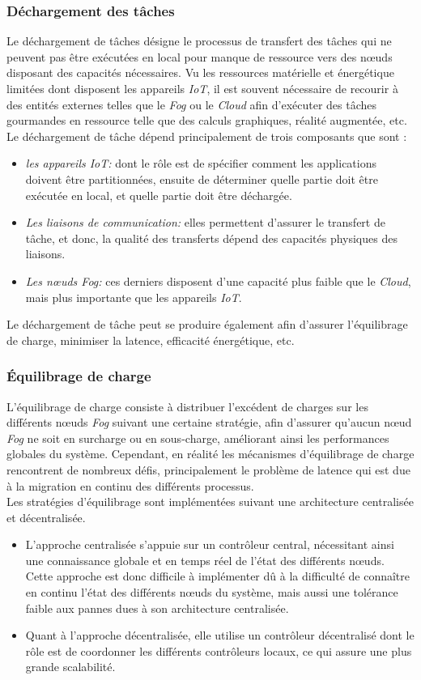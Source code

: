 \subsubsection{Déchargement des tâches}
Le déchargement de tâches désigne le processus de transfert des tâches qui ne peuvent pas être exécutées en local pour manque de ressource vers des nœuds disposant des capacités nécessaires. Vu les ressources matérielle et énergétique limitées dont disposent les appareils \emph{IoT}, il est souvent nécessaire de recourir à des entités externes telles que le \emph{Fog} ou le \emph{Cloud} afin d'exécuter des tâches gourmandes en ressource telle que des calculs graphiques, réalité augmentée, etc.\\
Le déchargement de tâche dépend principalement de trois composants que sont :
\begin{itemize}
  \item \emph{les appareils IoT:} dont le rôle est de spécifier comment les applications doivent être partitionnées, ensuite de déterminer quelle partie doit être exécutée en local, et quelle partie doit être déchargée.
  \item \emph{Les liaisons de communication:}  elles permettent d'assurer le transfert de tâche, et donc, la qualité des transferts dépend des capacités physiques des liaisons.
  \item \emph{Les nœuds Fog:} ces derniers disposent d'une capacité plus faible que le \emph{Cloud}, mais plus importante que les appareils \emph{IoT}.
\end{itemize}
Le déchargement de tâche peut se produire également afin d'assurer l'équilibrage de charge, minimiser la latence, efficacité énergétique, etc.

\subsubsection{Équilibrage de charge}
L'équilibrage de charge \cite{Ash2019} consiste à distribuer l'excédent de charges sur les différents nœuds \emph{Fog} suivant une certaine stratégie, afin d'assurer qu'aucun nœud \emph{Fog} ne soit en surcharge ou en sous-charge, améliorant ainsi les performances globales du système. Cependant, en réalité les mécanismes d'équilibrage de charge rencontrent de nombreux défis, principalement le problème de latence qui est due à la migration en continu des différents processus.\\
Les stratégies d'équilibrage sont implémentées suivant une architecture centralisée et décentralisée.
\begin{itemize}
  \item L'approche centralisée s'appuie sur un contrôleur central, nécessitant ainsi une connaissance globale et en temps réel de l'état des différents nœuds.
  Cette approche est donc difficile à implémenter dû à la difficulté de connaître en continu l'état des différents nœuds du système, mais aussi une tolérance faible aux pannes dues à son architecture centralisée.
  \item Quant à l'approche décentralisée, elle utilise un contrôleur décentralisé dont le rôle est de coordonner les différents contrôleurs locaux, ce qui assure une plus grande scalabilité.
\end{itemize}

